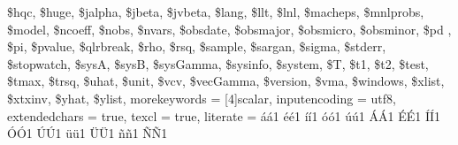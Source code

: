 {{                \$hqc, \$huge, \$jalpha, \$jbeta, \$jvbeta,
                \$lang, \$llt, \$lnl, \$macheps, \$mnlprobs,
                \$model, \$ncoeff, \$nobs, \$nvars, \$obsdate,
                \$obsmajor, \$obsmicro, \$obsminor, \$pd , \$pi,
                \$pvalue, \$qlrbreak, \$rho, \$rsq, \$sample,
                \$sargan, \$sigma, \$stderr, \$stopwatch, \$sysA,
                \$sysB, \$sysGamma, \$sysinfo, \$system, \$T,
                \$t1, \$t2, \$test, \$tmax, \$trsq,
                \$uhat, \$unit, \$vcv, \$vecGamma, \$version,
                \$vma, \$windows, \$xlist, \$xtxinv, \$yhat,
                \$ylist},
        morekeywords = [4]{scalar}, %
    inputencoding = utf8,  %
    extendedchars = true,  %
    texcl         = true,  %
    literate      =        %
      {á}{{\'a}}1  {é}{{\'e}}1  {í}{{\'i}}1 {ó}{{\'o}}1  {ú}{{\'u}}1
      {Á}{{\'A}}1  {É}{{\'E}}1  {Í}{{\'I}}1 {Ó}{{\'O}}1  {Ú}{{\'U}}1
      {ü}{{\"u}}1  {Ü}{{\"U}}1  {ñ}{{\~n}}1 {Ñ}{{\~N}}1  
}
